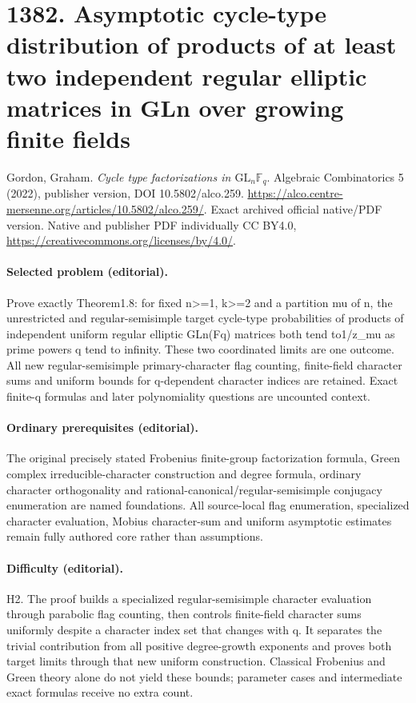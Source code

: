 \documentclass[10pt]{article}
\theoremstyle{definition}
\begin{document}
\section*{1382. Asymptotic cycle-type distribution of products of at least two independent regular elliptic matrices in GLn over growing finite fields}
Gordon, Graham. \emph{Cycle type factorizations in \(\mathrm{GL}_n\mathbb{F}_q\)}. Algebraic Combinatorics 5 (2022), publisher version, DOI 10.5802/alco.259. \url{https://alco.centre-mersenne.org/articles/10.5802/alco.259/}. Exact archived official native/PDF version. Native and publisher PDF individually CC BY4.0, \url{https://creativecommons.org/licenses/by/4.0/}.
\paragraph{Selected problem (editorial).} Prove exactly Theorem1.8: for fixed n>=1, k>=2 and a partition mu of n, the unrestricted and regular-semisimple target cycle-type probabilities of products of independent uniform regular elliptic GLn(Fq) matrices both tend to1/z\_mu as prime powers q tend to infinity. These two coordinated limits are one outcome. All new regular-semisimple primary-character flag counting, finite-field character sums and uniform bounds for q-dependent character indices are retained. Exact finite-q formulas and later polynomiality questions are uncounted context.
\paragraph{Ordinary prerequisites (editorial).} The original precisely stated Frobenius finite-group factorization formula, Green complex irreducible-character construction and degree formula, ordinary character orthogonality and rational-canonical/regular-semisimple conjugacy enumeration are named foundations. All source-local flag enumeration, specialized character evaluation, Mobius character-sum and uniform asymptotic estimates remain fully authored core rather than assumptions.
\paragraph{Difficulty (editorial).} H2. The proof builds a specialized regular-semisimple character evaluation through parabolic flag counting, then controls finite-field character sums uniformly despite a character index set that changes with q. It separates the trivial contribution from all positive degree-growth exponents and proves both target limits through that new uniform construction. Classical Frobenius and Green theory alone do not yield these bounds; parameter cases and intermediate exact formulas receive no extra count.
\end{document}

